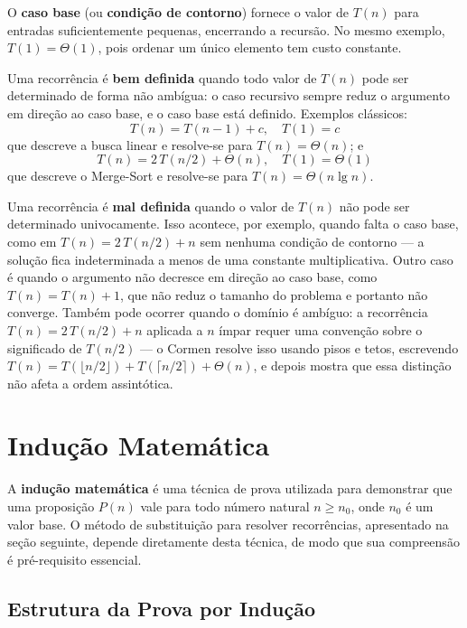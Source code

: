 \documentclass[9pt,a4paper]{extarticle}
\begin{document}
O \textbf{caso base} (ou \textbf{condição de contorno}) fornece o valor de $T(n)$ para entradas suficientemente pequenas, encerrando a recursão. No mesmo exemplo, $T(1) = \Theta(1)$, pois ordenar um único elemento tem custo constante. %

Uma recorrência é \textbf{bem definida} quando todo valor de $T(n)$ pode ser determinado de forma não ambígua: o caso recursivo sempre reduz o argumento em direção ao caso base, e o caso base está definido. Exemplos clássicos:
%
\[
T(n) = T(n-1) + c, \quad T(1) = c
\]
%
\noindent que descreve a busca linear e resolve-se para $T(n) = \Theta(n)$; e
%
\[
T(n) = 2\,T(n/2) + \Theta(n), \quad T(1) = \Theta(1)
\]
%
\noindent que descreve o Merge-Sort e resolve-se para $T(n) = \Theta(n \lg n)$.

Uma recorrência é \textbf{mal definida} quando o valor de $T(n)$ não pode ser determinado univocamente. Isso acontece, por exemplo, quando falta o caso base, como em $T(n) = 2\,T(n/2) + n$ sem nenhuma condição de contorno --- a solução fica indeterminada a menos de uma constante multiplicativa. Outro caso é quando o argumento não decresce em direção ao caso base, como $T(n) = T(n) + 1$, que não reduz o tamanho do problema e portanto não converge. Também pode ocorrer quando o domínio é ambíguo: a recorrência $T(n) = 2\,T(n/2) + n$ aplicada a $n$ ímpar requer uma convenção sobre o significado de $T(n/2)$ --- o Cormen resolve isso usando pisos e tetos, escrevendo $T(n) = T(\lfloor n/2 \rfloor) + T(\lceil n/2 \rceil) + \Theta(n)$, e depois mostra que essa distinção não afeta a ordem assintótica.


\section{Indução Matemática}

A \textbf{indução matemática} é uma técnica de prova utilizada para demonstrar que uma proposição $P(n)$ vale para todo número natural $n \geq n_0$, onde $n_0$ é um valor base. O método de substituição para resolver recorrências, apresentado na seção seguinte, depende diretamente desta técnica, de modo que sua compreensão é pré-requisito essencial.

\subsection{Estrutura da Prova por Indução}
\end{document}
